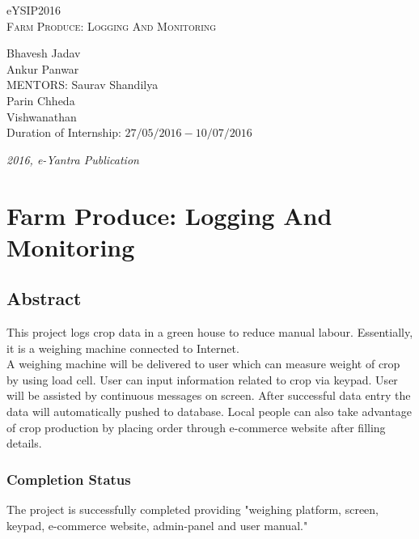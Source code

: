\documentclass[a4paper,12pt,oneside]{book}
\begin{document}
\begin{titlepage}
\raggedright
{\Large eYSIP2016\\[1cm]}
{\Huge\scshape Farm Produce: Logging And Monitoring \\[.1in]}
\vfill
\begin{flushright}
{\large Bhavesh Jadav \\}
{\large Ankur Panwar \\}
{\large MENTORS\hspace{.1in}:}
{\large Saurav Shandilya\\}
{\large Parin Chheda\\}
{\Large Vishwanathan\\}
{\large Duration of Internship: $ 27/05/2016-10/07/2016 $ \\}
\end{flushright}

{\itshape 2016, e-Yantra Publication}
\end{titlepage}

\chapter[Project Tag]{Farm Produce: Logging And \\ Monitoring}
\section*{Abstract}
This project logs crop data in a green house to reduce manual labour. Essentially, it is a weighing machine connected to Internet.\\
A weighing machine will be delivered to user which can measure weight of crop by using load cell. User can input information related to crop via keypad. User will be assisted by continuous messages on screen. After successful data entry the data will automatically pushed to database. Local people can also take advantage of crop production by placing order through e-commerce website after filling details.

\subsection*{Completion Status}
The project is successfully completed providing "weighing platform, screen, keypad, e-commerce website, admin-panel and user manual." 
\end{document}
